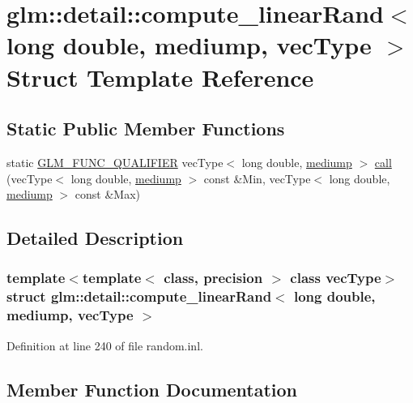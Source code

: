 \hypertarget{structglm_1_1detail_1_1compute__linear_rand_3_01long_01double_00_01mediump_00_01vec_type_01_4}{}\section{glm\+::detail\+::compute\+\_\+linear\+Rand$<$ long double, mediump, vec\+Type $>$ Struct Template Reference}
\label{structglm_1_1detail_1_1compute__linear_rand_3_01long_01double_00_01mediump_00_01vec_type_01_4}
\subsection*{Static Public Member Functions}
\begin{DoxyCompactItemize}
\item 
static \mbox{\hyperlink{setup_8hpp_a33fdea6f91c5f834105f7415e2a64407}{G\+L\+M\+\_\+\+F\+U\+N\+C\+\_\+\+Q\+U\+A\+L\+I\+F\+I\+ER}} vec\+Type$<$ long double, \mbox{\hyperlink{namespaceglm_a0f04f086094c747d227af4425893f545a6416f3ea0c9025fb21ed50c4d6620482}{mediump}} $>$ \mbox{\hyperlink{structglm_1_1detail_1_1compute__linear_rand_3_01long_01double_00_01mediump_00_01vec_type_01_4_a80a124d814f09a6892657886e0ae345a}{call}} (vec\+Type$<$ long double, \mbox{\hyperlink{namespaceglm_a0f04f086094c747d227af4425893f545a6416f3ea0c9025fb21ed50c4d6620482}{mediump}} $>$ const \&Min, vec\+Type$<$ long double, \mbox{\hyperlink{namespaceglm_a0f04f086094c747d227af4425893f545a6416f3ea0c9025fb21ed50c4d6620482}{mediump}} $>$ const \&Max)
\end{DoxyCompactItemize}


\subsection{Detailed Description}
\subsubsection*{template$<$template$<$ class, precision $>$ class vec\+Type$>$\newline
struct glm\+::detail\+::compute\+\_\+linear\+Rand$<$ long double, mediump, vec\+Type $>$}



Definition at line 240 of file random.\+inl.



\subsection{Member Function Documentation}
\mbox{\label{structglm_1_1detail_1_1compute__linear_rand_3_01long_01double_00_01mediump_00_01vec_type_01_4_a80a124d814f09a6892657886e0ae345a}} 
